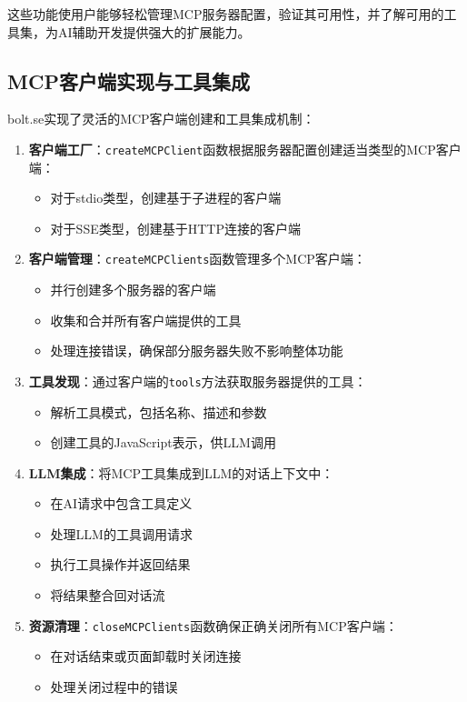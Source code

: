 这些功能使用户能够轻松管理MCP服务器配置，验证其可用性，并了解可用的工具集，为AI辅助开发提供强大的扩展能力。

\subsection{MCP客户端实现与工具集成}
bolt.se实现了灵活的MCP客户端创建和工具集成机制：

\begin{enumerate}
  \item \textbf{客户端工厂}：\texttt{createMCPClient}函数根据服务器配置创建适当类型的MCP客户端：
    \begin{itemize}
      \item 对于stdio类型，创建基于子进程的客户端
      \item 对于SSE类型，创建基于HTTP连接的客户端
    \end{itemize}
  
  \item \textbf{客户端管理}：\texttt{createMCPClients}函数管理多个MCP客户端：
    \begin{itemize}
      \item 并行创建多个服务器的客户端
      \item 收集和合并所有客户端提供的工具
      \item 处理连接错误，确保部分服务器失败不影响整体功能
    \end{itemize}
  
  \item \textbf{工具发现}：通过客户端的\texttt{tools}方法获取服务器提供的工具：
    \begin{itemize}
      \item 解析工具模式，包括名称、描述和参数
      \item 创建工具的JavaScript表示，供LLM调用
    \end{itemize}
  
  \item \textbf{LLM集成}：将MCP工具集成到LLM的对话上下文中：
    \begin{itemize}
      \item 在AI请求中包含工具定义
      \item 处理LLM的工具调用请求
      \item 执行工具操作并返回结果
      \item 将结果整合回对话流
    \end{itemize}
  
  \item \textbf{资源清理}：\texttt{closeMCPClients}函数确保正确关闭所有MCP客户端：
    \begin{itemize}
      \item 在对话结束或页面卸载时关闭连接
      \item 处理关闭过程中的错误
    \end{itemize}
\end{enumerate}

